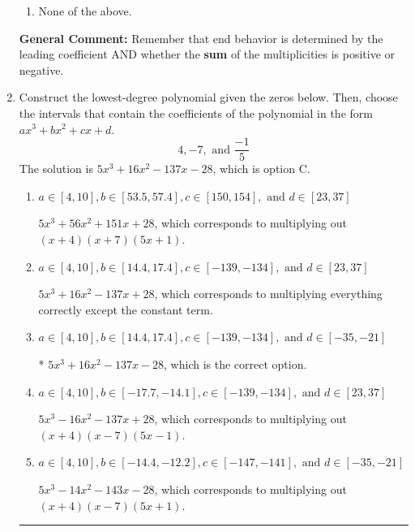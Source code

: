 \documentclass{extbook}[14pt]
\newcommand{\litem}[1]{\item #1

\rule{\textwidth}{0.4pt}}
\begin{document}
\begin{enumerate}
{\begin{enumerate}[label=\Alph*.]
\begin{multicols}{2}
\end{multicols}\item None of the above.\end{enumerate}
\textbf{General Comment:} Remember that end behavior is determined by the leading coefficient AND whether the \textbf{sum} of the multiplicities is positive or negative.
}
\litem{
Construct the lowest-degree polynomial given the zeros below. Then, choose the intervals that contain the coefficients of the polynomial in the form $ax^3+bx^2+cx+d$.
\[ 4, -7, \text{ and } \frac{-1}{5} \]The solution is \( 5x^{3} +16 x^{2} -137 x -28 \), which is option C.\begin{enumerate}[label=\Alph*.]
\item \( a \in [4, 10], b \in [53.5, 57.4], c \in [150, 154], \text{ and } d \in [23, 37] \)

$5x^{3} +56 x^{2} +151 x + 28$, which corresponds to multiplying out $(x + 4)(x + 7)(5x + 1)$.
\item \( a \in [4, 10], b \in [14.4, 17.4], c \in [-139, -134], \text{ and } d \in [23, 37] \)

$5x^{3} +16 x^{2} -137 x + 28$, which corresponds to multiplying everything correctly except the constant term.
\item \( a \in [4, 10], b \in [14.4, 17.4], c \in [-139, -134], \text{ and } d \in [-35, -21] \)

* $5x^{3} +16 x^{2} -137 x -28$, which is the correct option.
\item \( a \in [4, 10], b \in [-17.7, -14.1], c \in [-139, -134], \text{ and } d \in [23, 37] \)

$5x^{3} -16 x^{2} -137 x + 28$, which corresponds to multiplying out $(x + 4)(x -7)(5x -1)$.
\item \( a \in [4, 10], b \in [-14.4, -12.2], c \in [-147, -141], \text{ and } d \in [-35, -21] \)

$5x^{3} -14 x^{2} -143 x -28$, which corresponds to multiplying out $(x + 4)(x -7)(5x + 1)$.
\end{enumerate}

}
\end{enumerate}
\end{document}
